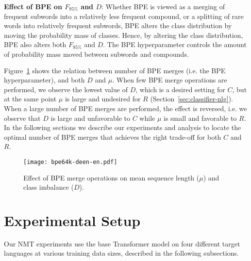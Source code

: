 \textbf{Effect of BPE on $F_{95\%}$ and $D$}:
Whether BPE is viewed as a merging of frequent subwords into a relatively less frequent compound, or a splitting of rare words into relatively frequent subwords, BPE alters the class distribution by moving the probability mass of classes.
Hence, by altering the class distribution, BPE also alters both $F_{95\%}$ and $D$. The BPE hyperparameter controls the amount of probability mass moved between subwords and compounds.

Figure~\ref{fig:BPE-imbalance} shows the relation between number of BPE merges (i.e. the BPE hyperparameter), and both $D$ and $\mu$.
When few BPE merge operations are performed, we observe the lowest value of $D$, which is a desired setting for $C$, but at the same point $\mu$ is large and undesired for $R$ (Section~\ref{sec:classifier-nlg}).
When a large number of BPE merges are performed, the effect is reversed, i.e. we observe that $D$ is large and unfavorable to $C$ while $\mu$ is small and favorable to $R$. 
In the following sections we describe our experiments and analysis to locate the optimal number of BPE merges that achieves the right trade-off for both $C$ and $R$. 

 \begin{figure}[ht]
  \centering
    \texttt{[image: bpe64k-deen-en.pdf]}
    \caption{Effect of BPE merge operations on mean sequence length ($\mu$) and class imbalance ($D$).
    } 
    \label{fig:BPE-imbalance}
\end{figure}


\section{Experimental Setup}
\label{sec:exp-setup}

Our NMT experiments use the base Transformer model \cite{vaswani2017attention} on four different target languages at various training data sizes, described in the following subsections. 

